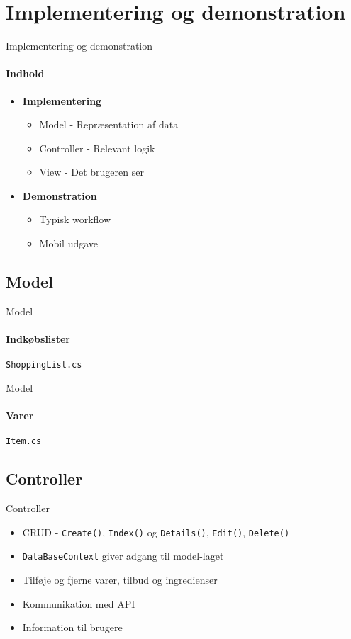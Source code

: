 \section{Implementering og demonstration}
\begin{frame}{Implementering og demonstration}
	\framesubtitle{Indhold}
    \begin{itemize}
    		\item \textbf{Implementering}
    		\begin{itemize}
		\item Model - Repræsentation af data
		\item Controller - Relevant logik
		\item View - Det brugeren ser
        \end{itemize}
        \vspace{12pt}
        \item \textbf{Demonstration} 
        \begin{itemize}
        \item Typisk workflow        
        \item Mobil udgave  
        \end{itemize}        
    \end{itemize}
\end{frame}

\subsection{Model}
\begin{frame}{Model}
	\framesubtitle{Indkøbslister}
	\texttt{ShoppingList.cs}
	\hbox{\hspace{5 mm}\scalebox{0.8}{
	 }}	
\end{frame}
\begin{frame}{Model}
	\framesubtitle{Varer}	
	\texttt{Item.cs}
	\hbox{\hspace{5 mm}\scalebox{0.8}{
		}}
\end{frame}

\subsection{Controller}
\begin{frame}{Controller}
	\begin{itemize}
		\item CRUD - \texttt{Create()}, \texttt{Index()} og \texttt{Details()}, \texttt{Edit()}, \texttt{Delete()}
		\item \texttt{DataBaseContext} giver adgang til model-laget
		\vspace{15pt}
		\item Tilføje og fjerne varer, tilbud og ingredienser
		\item Kommunikation med API
		\item Information til brugere
	\end{itemize}
\end{frame}

